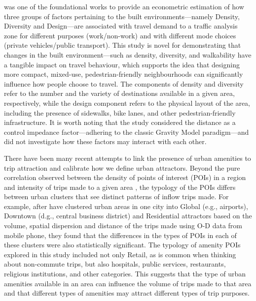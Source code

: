 \citet{cerveroTravelDemand3Ds1997} was one of the foundational works to provide an econometric estimation of how three groups of factors pertaining to the built environments---namely Density, Diversity and Design---are associated with travel demand to a traffic analysis zone for different purposes (work/non-work) and with different mode choices (private vehicles/public transport). This study is novel for demonstrating that changes in the built environment—such as density, diversity, and walkability have a tangible impact on travel behaviour, which supports the idea that designing more compact, mixed-use, pedestrian-friendly neighbourhoods can significantly influence how people choose to travel. The components of density and diversity refer to the number and the variety of destinations available in a given area, respectively, while the design component refers to the physical layout of the area, including the presence of sidewalks, bike lanes, and other pedestrian-friendly infrastructure. It is worth noting that the study considered the distance as a control impedance factor---adhering to the classic Gravity Model paradigm---and did not investigate how these factors may interact with each other.

There have been many recent attempts to link the presence of urban amenities to trip attraction and calibrate how we define urban attractors. Beyond the pure correlation observed between the density of points of interest (POIs) in a region and intensity of trips made to a given area \citep{melikovCharacterizingUrbanMobility2021}, the typology of the POIs differs between urban clusters that see distinct patterns of inflow trips made. For example, after \citet{aaqibjavedEstimationTripAttraction2020} have clustered urban areas in one city into Global (e.g., airports), Downtown (d.g., central business district) and Residential attractors based on the volume, spatial dispersion and distance of the trips made using O-D data from mobile phone, they found that the differences in the types of POIs in each of these clusters were also statistically significant. The typology of amenity POIs explored in this study included not only Retail, as is common when thinking about non-commute trips, but also hospitals, public services, restaurants, religious institutions, and other categories. This suggests that the type of urban amenities available in an area can influence the volume of trips made to that area and that different types of amenities may attract different types of trip purposes.

